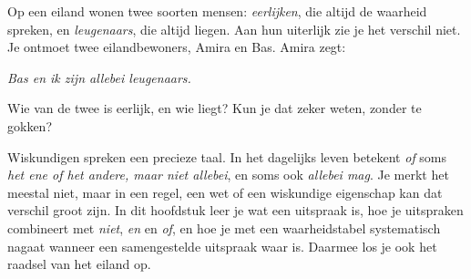 %


\begin{probleem}
Op een eiland wonen twee soorten mensen: \textit{eerlijken}, die altijd de waarheid spreken, en \textit{leugenaars}, die altijd liegen. Aan hun uiterlijk zie je het verschil niet. Je ontmoet twee eilandbewoners, Amira en Bas. Amira zegt:

\smallskip
{\leftskip=6mm\textit{Bas en ik zijn allebei leugenaars.}\par}

\smallskip
Wie van de twee is eerlijk, en wie liegt? Kun je dat zeker weten, zonder te gokken?
\end{probleem}


Wiskundigen spreken een precieze taal. In het dagelijks leven betekent \textit{of} soms \textit{het ene of het andere, maar niet allebei}, en soms ook \textit{allebei mag}. Je merkt het meestal niet, maar in een regel, een wet of een wiskundige eigenschap kan dat verschil groot zijn. In dit hoofdstuk leer je wat een uitspraak is, hoe je uitspraken combineert met \textit{niet}, \textit{en} en \textit{of}, en hoe je met een waarheidstabel systematisch nagaat wanneer een samengestelde uitspraak waar is. Daarmee los je ook het raadsel van het eiland op.

